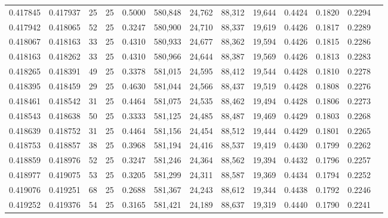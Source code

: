 \begin{tabular}{rrrrrrrrrrrrr}
0.417845 & 0.417937 &    25 &  25 &                                     0.5000 & 580,848 &  24,762 &  88,312 &  19,644 & 0.4424 & 0.1820 & 0.2294 \\
0.417942 & 0.418065 &    52 &  25 &                                     0.3247 & 580,900 &  24,710 &  88,337 &  19,619 & 0.4426 & 0.1817 & 0.2289 \\
0.418067 & 0.418163 &    33 &  25 &                                     0.4310 & 580,933 &  24,677 &  88,362 &  19,594 & 0.4426 & 0.1815 & 0.2286 \\
0.418163 & 0.418262 &    33 &  25 &                                     0.4310 & 580,966 &  24,644 &  88,387 &  19,569 & 0.4426 & 0.1813 & 0.2283 \\
0.418265 & 0.418391 &    49 &  25 &                                     0.3378 & 581,015 &  24,595 &  88,412 &  19,544 & 0.4428 & 0.1810 & 0.2278 \\
0.418395 & 0.418459 &    29 &  25 &                                     0.4630 & 581,044 &  24,566 &  88,437 &  19,519 & 0.4428 & 0.1808 & 0.2276 \\
0.418461 & 0.418542 &    31 &  25 &                                     0.4464 & 581,075 &  24,535 &  88,462 &  19,494 & 0.4428 & 0.1806 & 0.2273 \\
0.418543 & 0.418638 &    50 &  25 &                                     0.3333 & 581,125 &  24,485 &  88,487 &  19,469 & 0.4429 & 0.1803 & 0.2268 \\
0.418639 & 0.418752 &    31 &  25 &                                     0.4464 & 581,156 &  24,454 &  88,512 &  19,444 & 0.4429 & 0.1801 & 0.2265 \\
0.418753 & 0.418857 &    38 &  25 &                                     0.3968 & 581,194 &  24,416 &  88,537 &  19,419 & 0.4430 & 0.1799 & 0.2262 \\
0.418859 & 0.418976 &    52 &  25 &                                     0.3247 & 581,246 &  24,364 &  88,562 &  19,394 & 0.4432 & 0.1796 & 0.2257 \\
0.418977 & 0.419075 &    53 &  25 &                                     0.3205 & 581,299 &  24,311 &  88,587 &  19,369 & 0.4434 & 0.1794 & 0.2252 \\
0.419076 & 0.419251 &    68 &  25 &                                     0.2688 & 581,367 &  24,243 &  88,612 &  19,344 & 0.4438 & 0.1792 & 0.2246 \\
0.419252 & 0.419376 &    54 &  25 &                                     0.3165 & 581,421 &  24,189 &  88,637 &  19,319 & 0.4440 & 0.1790 & 0.2241 \\

\end{tabular}
